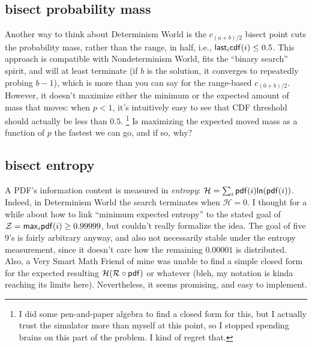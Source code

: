 \documentclass[11pt]{sigplanconf}
\begin{document}
\subsection{bisect probability mass}

Another way to think about Determinism World is the $c_{(a+b)/2}$ bisect point
cuts the probability mass, rather than the range, in half,
i.e., $\mathsf{last}_i \mathsf{cdf}(i) \le 0.5$.
This approach is compatible with Nondeterminism World,
fits the ``binary search'' spirit,
and will at least terminate
(if $b$ is the solution, it converges to repeatedly probing $b-1$),
which is more than you can say for the range-based $c_{(0+b)/2}$.
However, it doesn't maximize either the minimum or the expected amount of mass that moves:
when $p<1$, it's intuitively easy to see that CDF threshold should actually be less than $0.5$.
\footnote{I did some pen-and-paper algebra to find a closed form for this,
but I actually trust the simulator more than myself at this point,
so I stopped spending brains on this part of the problem. I kind of regret that.}
Is maximizing the expected moved mass as a function of $p$ the fastest we can go,
and if so, why?

\subsection{bisect entropy}

\newcommand\entropy{\ensuremath{\mathcal{H}}\xspace}

A PDF's information content is measured in {\it entropy}:
$\entropy = \sum_i \pdf(i)\mathsf{ln}(\pdf(i))$.
Indeed,
in Determinism World the search terminates when $\entropy = 0$.
I thought for a while about how to link ``minimum expected entropy''
to the stated goal %
of
$\mathcal{Z} = \mathsf{max}_i \mathsf{pdf}(i) \ge 0.99999$,
but couldn't really formalize the idea.
The goal of five 9's is fairly arbitrary anyway,
and also not necessarily stable under the entropy measurement,
since it doesn't care how the remaining $0.00001$ is distributed.
%
Also, a Very Smart Math Friend of mine was unable to find a simple closed form for
the expected resulting $\entropy(\renorm{} \circ \pdf)$
or whatever (bleh, my notation is kinda reaching its limits here).
Nevertheless, it seems promising, and easy to implement.
\end{document}
